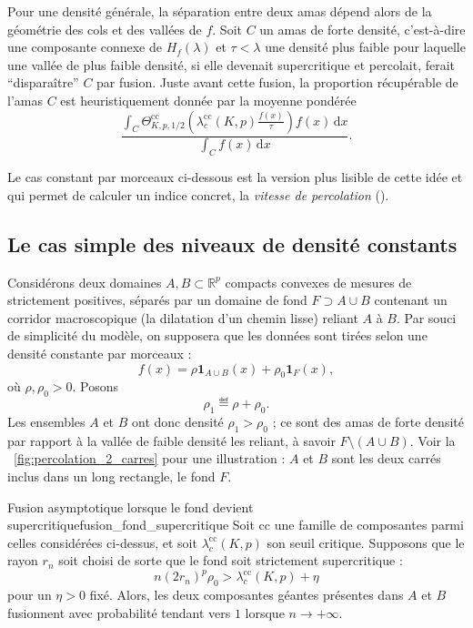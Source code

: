 Pour une densité générale, la séparation entre deux amas dépend alors de la géométrie des cols et des vallées de $f$. 
Soit $C$ un amas de forte densité, c'est-à-dire une composante connexe de $H_f(\lambda)$ et $\tau < \lambda$ une densité plus faible pour laquelle une vallée de plus faible densité, si elle devenait supercritique et percolait, ferait ``disparaître'' $C$ par fusion.
Juste avant cette fusion, la proportion récupérable de l'amas $C$ est heuristiquement donnée par la moyenne pondérée
\begin{equation}\label{eq:frac_recouvrement}
    \frac{
        \displaystyle \int_C
        \Theta^{\mathrm{cc}}_{K,p,1/2}
        \left(
            \lambda_c^{\mathrm{cc}}(K,p)\frac{f(x)}{\tau}
        \right)
        f(x)\,\mathrm dx
    }{
        \displaystyle \int_C f(x)\,\mathrm dx
    }.
\end{equation}

Le cas constant par morceaux ci-dessous est la version plus lisible de cette idée et qui permet de calculer un indice concret, la \emph{vitesse de percolation} ().

\subsection{Le cas simple des niveaux de densité constants}

Considérons deux domaines $A,B\subset\mathbb R^p$ compacts convexes de mesures de  strictement positives, %
séparés par un domaine de fond $F \supset A \cup B$ contenant un corridor macroscopique (la dilatation d'un chemin lisse) reliant $A$ à $B$. Par souci de simplicité du modèle, on supposera que les données sont tirées selon une densité constante par morceaux :
\[
    f(x)=
    \rho\mathbf 1_{A\cup B}(x)+\rho_0\mathbf 1_F(x),
\]
où $\rho, \rho_0 > 0$. Posons
\[
    \rho_1 \eqdef \rho+\rho_0.
\]
Les ensembles $A$ et $B$ ont donc densité $\rho_1>\rho_0$ ; ce sont des amas de forte densité par rapport à la vallée de faible densité les reliant, à savoir $F \setminus (A\cup B)$. Voir la \Fig~\ref{fig:percolation_2_carres} pour une illustration : $A$ et $B$ sont les deux carrés inclus dans un long rectangle, le fond $F$.

\begin{Fait}{Fusion asymptotique lorsque le fond devient supercritique}{fusion_fond_supercritique}
Soit $\mathrm{cc}$ une famille de composantes parmi celles considérées ci-dessus, et soit $\lambda_c^{\mathrm{cc}}(K,p)$ son seuil critique. Supposons que le rayon $r_n$ soit choisi de sorte que le fond soit strictement supercritique :
\[
    n(2r_n)^p\rho_0
    >
    \lambda_c^{\mathrm{cc}}(K,p)+\eta
\]
pour un $\eta>0$ fixé. Alors, %
les deux composantes géantes présentes dans $A$ et $B$ fusionnent avec probabilité tendant vers $1$ lorsque $n\to+\infty$.
\end{Fait}

